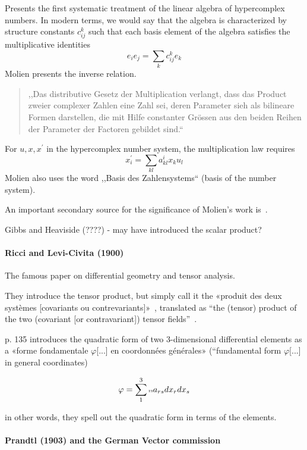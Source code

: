 Presents the first systematic treatment of the linear algebra of hypercomplex numbers.
In modern terms, we would say that the algebra is characterized by structure constants $c_{ij}^k$ such that each basis element of the algebra satisfies the multiplicative identities
\[
e_i e_j = \sum_k c^k_{ij} e_k
\]
Molien presents the inverse relation.
\begin{quote}
,,Das distributive Gesetz der Multiplication verlangt, dass das Product
zweier complexer Zahlen eine Zahl sei, deren Parameter sieh als bilineare
Formen darstellen, die mit Hilfe constanter Grössen aus den beiden
Reihen der Parameter der Factoren gebildet sind.``
\end{quote}
For $u, x, x^\prime$ in the hypercomplex number system, the multiplication law
requires
\[
x_i^\prime = \sum_{kl} a^i_{kl} x_k u_l
\]
Molien also uses the word ,,Basis des Zahlensystems`` (basis of the number system).

An important secondary source for the significance of Molien's work is~\cite{Hawkins1972}.

Gibbs and Heaviside (????) - may have introduced the scalar product?



\paragraph{Ricci and Levi-Civita (1900)~\cite{Ricci1900,Hermann1975}}

The famous paper on differential geometry and tensor analysis.

They introduce the tensor product, but simply call it the
«produit des deux systèmes [covariants ou contrevariants]»~\cite[p. 133]{Ricci1900}, translated as
``the (tensor) product of the two (covariant [or contravariant]) tensor fields''~\cite[p. 28]{Hermann1975}.

p. 135 introduces the quadratic form of two 3-dimensional differential elements as a «forme fondamentale $\varphi$[...] en coordonnées générales» (``fundamental form $\varphi$[...] in general coordinates)

\[
\varphi = \sum_1^3 \text{\tiny{rs}} a_{rs} dx_r dx_s
\]

in other words, they spell out the quadratic form in terms of the elements.



\paragraph{Prandtl (1903) and the German Vector commission}

